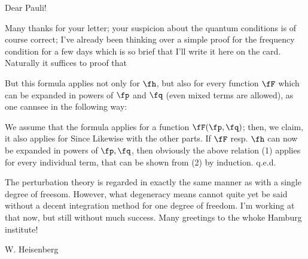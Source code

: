 \date{September 24, 1925}

Dear Pauli!

Many thanks for your letter; your suspicion about the quantum conditions is of course correct; I've already been thinking over a simple proof for the frequency condition for a few days which is so brief that I'll write it here on the card. Naturally it suffices to proof that

But this formula applies not only for $\fh$, but also for every function $\fF$ which can be expanded in powers of $\fp$ and $\fq$ (even mixed terms are allowed), as one cannsee in the following way:

We assume that the formula applies for a function $\fF(\fp, \fq)$; then, we claim, it also applies for
Since
Likewise with the other parts. If $\fF$ resp. $\fh$ can now be expanded in powers of $\fp,\fq$, then obviously the above relation (1) applies for every individual term, that can be shown from (2) by induction. q.e.d.

The perturbation theory is regarded in exactly the same manner as with a single degree of freesom. However, what degeneracy means cannot quite yet be said without a decent integration method for one degree of freedom. I'm working at that now, but still without much success. Many greetings to the whoke Hamburg institute!

W. Heisenberg
